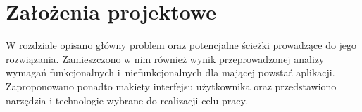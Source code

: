 \chapter{Założenia projektowe}
W rozdziale opisano główny problem oraz potencjalne ścieżki prowadzące do jego rozwiązania. Zamieszczono w nim również wynik przeprowadzonej analizy wymagań funkcjonalnych i~niefunkcjonalnych dla mającej powstać aplikacji. Zaproponowano ponadto makiety interfejsu użytkownika oraz przedstawiono narzędzia i technologie wybrane do realizacji celu pracy.




